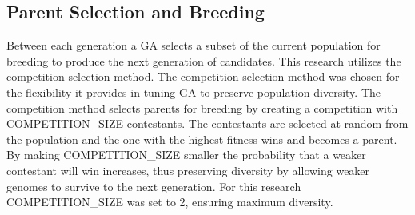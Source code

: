 \subsection{Parent Selection and Breeding}
Between each generation a GA selects a subset of the current population for breeding to produce the next generation of candidates. This research utilizes the competition selection method. The competition selection method was chosen for the flexibility it provides in tuning GA to preserve population diversity. The competition method selects parents for breeding by creating a competition with COMPETITION\_SIZE contestants. The contestants are selected at random from the population and the one with the highest fitness wins and becomes a parent. By making COMPETITION\_SIZE smaller the probability that a weaker contestant will win increases, thus preserving diversity by allowing weaker genomes to survive to the next generation. For this research COMPETITION\_SIZE was set to 2, ensuring maximum diversity. 
